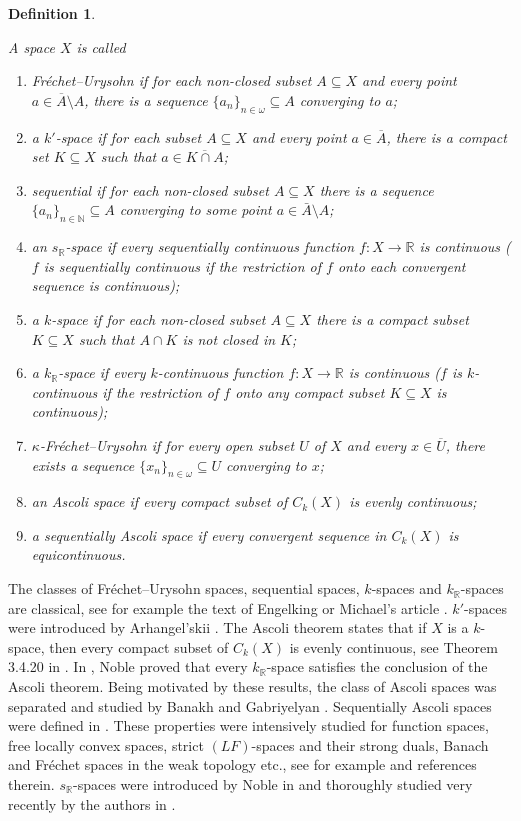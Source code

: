 \documentclass[preprint,11pt]{elsarticle}
\newtheorem{definition}[theorem]{Definition}
\numberwithin{equation}{section}
\numberwithin{theorem}{section}
\newcommand{\w}{\omega}
\newcommand{\NN}{\mathbb{N}}
\newcommand{\IR}{\mathbb{R}}
\newcommand{\CC}{C_k}
\newcommand{\SM}{{\setminus}}
\begin{document}
\begin{definition} \label{def:compact-type} {\em A space $X$ is called
\begin{enumerate}
\item[$\bullet$] {\em Fr\'{e}chet--Urysohn} if for each non-closed subset $A\subseteq X$ and every point $a\in \overline{A}\SM A$, there is a sequence $\{a_n\}_{n\in\w}\subseteq A$ converging to $a$;
\item[$\bullet$] a {\em $k'$-space} if for each subset $A\subseteq X$ and every point $a\in \overline{A}$, there is a compact set $K\subseteq X$ such that $a\in \overline{K\cap A}$;
\item[$\bullet$] {\em sequential} if for each non-closed subset $A\subseteq X$ there is a sequence $\{a_n\}_{n\in\NN}\subseteq A$ converging to some point $a\in \bar A\setminus A$;
\item[$\bullet$] an {\em $s_\IR$-space} if every sequentially continuous function $f:X\to\IR$ is continuous ($f$ is {\em sequentially continuous} if  the restriction of $f$ onto each convergent sequence is continuous);
\item[$\bullet$] a {\em $k$-space} if for each non-closed subset $A\subseteq X$ there is a compact subset $K\subseteq X$ such that $A\cap K$ is not closed in $K$;
\item[$\bullet$] a {\em $k_\IR$-space} if every $k$-continuous function $f:X\to\IR$ is continuous ($f$ is {\em $k$-continuous} if the restriction of $f$ onto any compact subset $K\subseteq X$ is continuous);
\item[$\bullet$] {\em $\kappa$-Fr\'{e}chet--Urysohn} if for every open subset $U$ of $X$ and every $x\in \overline{U}$, there exists a sequence $\{x_n\}_{n\in\w} \subseteq U$ converging to $x$;
\item[$\bullet$] an {\em Ascoli space} if every compact subset of $\CC(X)$ is evenly continuous;
\item[$\bullet$] a {\em sequentially Ascoli space} if every convergent sequence in $\CC(X)$ is equicontinuous.
\end{enumerate} }
\end{definition}
The classes of Fr\'{e}chet--Urysohn spaces, sequential spaces,  $k$-spaces and $k_\IR$-spaces are classical, see for example the text of Engelking \cite{Eng} or  Michael's article \cite{Mi73}. $k'$-spaces were introduced by Arhangel'skii \cite{Arhangel63,Arhan63}. The Ascoli theorem states that if $X$ is a $k$-space, then every compact subset of $\CC(X)$ is evenly continuous, see Theorem 3.4.20 in \cite{Eng}. In \cite{Noble}, Noble proved that every $k_\IR$-space satisfies the conclusion of the Ascoli theorem. Being motivated by these results, the class of Ascoli spaces was separated and studied by Banakh and Gabriyelyan \cite{BG}. Sequentially Ascoli spaces were defined in \cite{Gabr:weak-bar-L(X)}. These properties were intensively studied for function spaces, free locally convex spaces, strict $(LF)$-spaces and their strong duals, Banach and Fr\'{e}chet spaces in the weak topology etc., see for example \cite{Arhangel,Gabr,Jar,mcoy,S-W} and references therein. $s_\IR$-spaces were introduced by Noble in \cite{Nob}  and thoroughly studied very recently by the authors in \cite{GR-kR-sR,GR-prod}.
\end{document}
